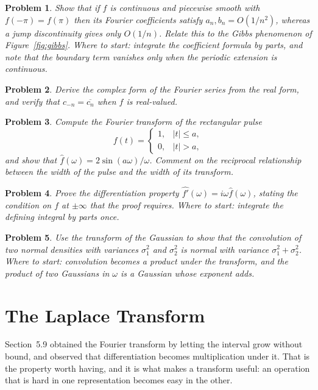\documentclass[12pt,a4paper]{report}
\theoremstyle{definition}
\theoremstyle{plain}
\newtheorem{problemx}{Problem}[section]
\newenvironment{problem}{\begin{problemx}}{\end{problemx}}
\begin{document}
\begin{problem}
Show that if $f$ is continuous and piecewise smooth with $f(-\pi)=f(\pi)$ then
its Fourier coefficients satisfy $a_n,b_n = O(1/n^{2})$, whereas a jump
discontinuity gives only $O(1/n)$. Relate this to the Gibbs phenomenon of
Figure~\ref{fig:gibbs}.
\emph{Where to start: integrate the coefficient formula by parts, and note that
the boundary term vanishes only when the periodic extension is continuous.}
\end{problem}

\begin{problem}
Derive the complex form of the Fourier series from the real form, and verify
that $c_{-n}=\overline{c_n}$ when $f$ is real-valued.
\end{problem}

\begin{problem}
Compute the Fourier transform of the rectangular pulse
$$f(t) = \begin{cases} 1, & |t|\leq a,\\ 0, & |t|>a,\end{cases}$$
and show that $\widehat{f}(\omega) = 2\sin(a\omega)/\omega$. Comment on the
reciprocal relationship between the width of the pulse and the width of its
transform.
\end{problem}

\begin{problem}
Prove the differentiation property $\widehat{f'}(\omega)=i\omega\widehat{f}(\omega)$,
stating the condition on $f$ at $\pm\infty$ that the proof requires.
\emph{Where to start: integrate the defining integral by parts once.}
\end{problem}

\begin{problem}
Use the transform of the Gaussian to show that the convolution of two normal
densities with variances $\sigma_1^{2}$ and $\sigma_2^{2}$ is normal with
variance $\sigma_1^{2}+\sigma_2^{2}$.
\emph{Where to start: convolution becomes a product under the transform, and
the product of two Gaussians in $\omega$ is a Gaussian whose exponent adds.}
\end{problem}


\chapter{The Laplace Transform}

Section~5.9 obtained the Fourier transform by letting the interval grow without
bound, and observed that differentiation becomes multiplication under it. That
is the property worth having, and it is what makes a transform useful: an
operation that is hard in one representation becomes easy in the other.
\end{document}
